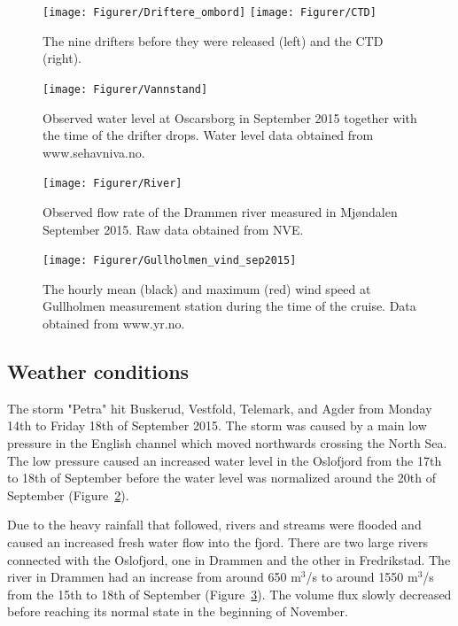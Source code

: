 \documentclass[12pt,a4paper,english]{article}
\begin{document}
\begin{figure}[b]
\centerline{
\texttt{[image: Figurer/Driftere\_ombord]}
\texttt{[image: Figurer/CTD]}
}
\caption{\small
The nine drifters before they were released (left) and the CTD (right).}
\label{fig:Utstyr}
\end{figure}

\begin{figure}[tb]
\centerline{
\texttt{[image: Figurer/Vannstand]}}
\caption{\small
Observed water level at Oscarsborg in September 2015 together with the time of the drifter drops. Water level data obtained from www.sehavniva.no.}
\label{fig:Waterlevel}
\end{figure}

\begin{figure}[tb]
\centerline{
\texttt{[image: Figurer/River]}}
\caption{\small
Observed flow rate of the Drammen river measured in Mj\o ndalen September 2015. Raw data obtained from NVE.}%
\label{fig:River}
\end{figure}

\begin{figure}[tb]
\centerline{
\texttt{[image: Figurer/Gullholmen\_vind\_sep2015]}}
\caption{\small
The hourly mean (black) and maximum (red) wind speed at Gullholmen measurement station during the time of the cruise. Data obtained from www.yr.no.}
\label{fig:Wind}
\end{figure}


\subsection{Weather conditions}

The storm "Petra" hit Buskerud, Vestfold, Telemark, and Agder from Monday 14th to Friday 18th of September 2015. The storm was caused by a main low pressure in the English channel which moved northwards crossing the North Sea. The low pressure caused an increased water level in the Oslofjord from the 17th to 18th of September before the water level was normalized around the 20th of September (Figure~\ref{fig:Waterlevel}).

Due to the heavy rainfall that followed, rivers and streams were flooded and caused an increased fresh water flow into the fjord. There are two large rivers connected with the Oslofjord, one in Drammen and the other in Fredrikstad. The river in Drammen had an increase from around 650 m$^3$/s to around 1550 m$^3$/s from the 15th to 18th of September (Figure~\ref{fig:River}). The volume flux slowly decreased before reaching its normal state in the beginning of November. 
\end{document}
